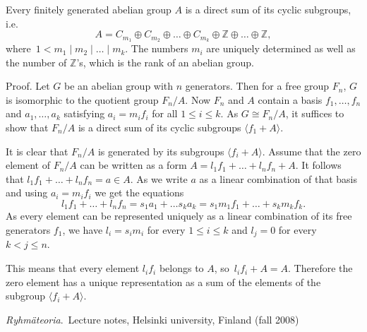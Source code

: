 \documentclass[12pt]{article}
\begin{document}
Every finitely generated abelian group $A$ is a direct sum of its cyclic subgroups, i.e. 
\[A=C_{m_1}\oplus C_{m_2}\oplus\ldots\oplus C_{m_k}\oplus \mathbb{Z}\oplus\ldots\oplus\mathbb{Z},\]
where\, $1<m_1 \mid m_2 \mid \ldots \mid m_k$.  The numbers $m_i$ are uniquely determined as well as the number of $\mathbb{Z}$'s, which is the rank of an abelian group.

Proof. Let $G$ be an abelian group with $n$ generators. Then for a free group $F_n$, $G$ is isomorphic to the quotient group $F_n/A$.  Now $F_n$ and $A$ contain a basis $f_1,\ldots,f_n$ and $a_1,\ldots,a_k$ satisfying $a_i=m_if_i$ for all $1\leq i\leq k$.  As $G\cong F_n/A$, it suffices to show that $F_n/A$ is a direct sum of its cyclic subgroups $\langle f_1+A\rangle$.

It is clear that $F_n/A$ is generated by its subgroups $\langle f_i+A\rangle$. Assume that the zero element of $F_n/A$ can be written as a form $A=l_1f_1+\ldots+l_nf_n+A$.  It follows that $l_1f_1+\ldots+l_nf_n=a\in A$. As we write $a$ as a linear combination of that basis and using $a_i=m_if_i$ we get the equations
\[l_1f_1+\ldots+l_nf_n=s_1a_1+\ldots s_ka_k=s_1m_1f_1+\ldots +s_km_kf_k.\]
As every element can be represented uniquely as a linear combination of its free generators $f_1$, we have $l_i=s_im_i$ for every $1\leq i\leq k$ and $l_j=0$ for every $k<j\leq n$.

This means that every element $l_if_i$ belongs to $A$, so\, $l_if_i+A=A$.  Therefore the zero element has a unique representation as a sum of the elements of the subgroup $\langle f_i+\!A\rangle$.

\begin{thebibliography}{9}
 {\em Ryhm\"ateoria}.\, Lecture notes, Helsinki university, Finland (fall 2008)
\end{thebibliography}
\end{document}
